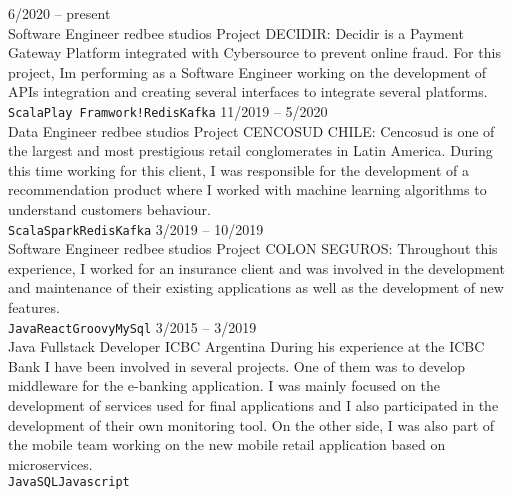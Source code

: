 \documentclass[9pt]{developercv} %
\begin{document}
\begin{entrylist}
	\entry
		{6/2020 -- present\\\footnotesize{}}
		{Software Engineer}
		{redbee studios}
		{Project DECIDIR: Decidir is a Payment Gateway Platform integrated with Cybersource to prevent online fraud. For this project, Im performing as a Software Engineer working on the development of APIs integration and creating several interfaces to integrate several platforms.
		\\ \texttt{Scala}\slashsep\texttt{Play Framwork!}\slashsep\texttt{Redis}\slashsep\texttt{Kafka}}
    \entry
		{11/2019 -- 5/2020\\\footnotesize{}}
		{Data Engineer}
		{redbee studios}
		{Project CENCOSUD CHILE: Cencosud is one of the largest and most prestigious retail conglomerates in Latin America. During this time working for this client, I was responsible for the development of a recommendation product where I worked with machine learning algorithms to understand customers behaviour.
		\\ \texttt{Scala}\slashsep\texttt{Spark}\slashsep\texttt{Redis}\slashsep\texttt{Kafka}}
	\entry
		{3/2019 -- 10/2019\\\footnotesize{}}
		{Software Engineer}
		{redbee studios}
		{Project COLON SEGUROS: Throughout this experience, I worked for an insurance client and was involved in the development and maintenance of their existing applications as well as the development of new features.
		\\ \texttt{Java}\slashsep\texttt{React}\slashsep\texttt{Groovy}\slashsep\texttt{MySql}}
	\entry
		{3/2015 -- 3/2019\\\footnotesize{}}
		{Java Fullstack Developer}
		{ICBC Argentina}
		{During his experience at the ICBC Bank I have been involved in several projects. One of them was to develop middleware for the e-banking application. I was mainly focused on the development of services used for final applications and I also participated in the development of their own monitoring tool. On the other side, I was also part of the mobile team working on the new mobile retail application based on microservices.
		\\ \texttt{Java}\slashsep\texttt{SQL}\slashsep\texttt{Javascript}}
\end{entrylist}

\end{document}
